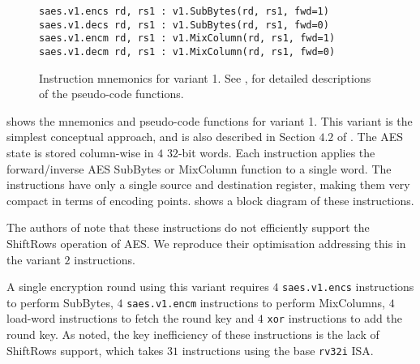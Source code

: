 
\begin{figure}
\begin{lstlisting}[language=pseudo,style=block]
saes.v1.encs rd, rs1 : v1.SubBytes(rd, rs1, fwd=1)
saes.v1.decs rd, rs1 : v1.SubBytes(rd, rs1, fwd=0)
saes.v1.encm rd, rs1 : v1.MixColumn(rd, rs1, fwd=1)
saes.v1.decm rd, rs1 : v1.MixColumn(rd, rs1, fwd=0)
\end{lstlisting}
\caption{
    Instruction mnemonics for variant 1.
    See ,  for detailed
    descriptions of the pseudo-code functions.
}
\label{fig:mnemonics:v1}
\end{figure}

 shows the mnemonics and pseudo-code functions
for variant 1.
This variant is the simplest conceptual approach, and
is also described in Section $4.2$ of \cite{TilGro:06}.
The AES state is stored column-wise in $4$ $32$-bit words.
Each instruction applies the forward/inverse AES SubBytes or
MixColumn function to a single word.
The instructions have only a single source and destination register,
making them very compact in terms of encoding points.
 shows a block diagram of these
instructions.

The authors of \cite{TilGro:06} note that these instructions do not
efficiently support the ShiftRows operation of AES.  We reproduce their
optimisation addressing this in the variant $2$ instructions.

A single encryption round using this variant requires
$4$ {\tt saes.v1.encs} instructions to perform SubBytes,
$4$ {\tt saes.v1.encm} instructions to perform MixColumns,
$4$ load-word instructions to fetch the round key
and
$4$ {\tt xor} instructions to add the round key.
As noted, the key inefficiency of these instructions is the
lack of ShiftRows support, which takes $31$ instructions using the
base {\tt rv32i} ISA.

